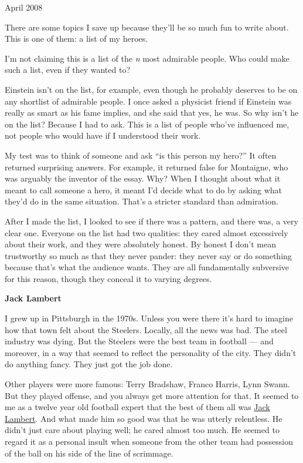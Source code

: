 April 2008

There are some topics I save up because they'll be so much fun to write
about. This is one of them: a list of my heroes.

I'm not claiming this is a list of the \emph{n} most admirable people.
Who could make such a list, even if they wanted to?

Einstein isn't on the list, for example, even though he probably
deserves to be on any shortlist of admirable people. I once asked a
physicist friend if Einstein was really as smart as his fame implies,
and she said that yes, he was. So why isn't he on the list? Because I
had to ask. This is a list of people who've influenced me, not people
who would have if I understood their work.

My test was to think of someone and ask ``is this person my hero?'' It
often returned surprising answers. For example, it returned false for
Montaigne, who was arguably the inventor of the essay. Why? When I
thought about what it meant to call someone a hero, it meant I'd decide
what to do by asking what they'd do in the same situation. That's a
stricter standard than admiration.

After I made the list, I looked to see if there was a pattern, and there
was, a very clear one. Everyone on the list had two qualities: they
cared almost excessively about their work, and they were absolutely
honest. By honest I don't mean trustworthy so much as that they never
pander: they never say or do something because that's what the audience
wants. They are all fundamentally subversive for this reason, though
they conceal it to varying degrees.

\textbf{Jack Lambert}

I grew up in Pittsburgh in the 1970s. Unless you were there it's hard to
imagine how that town felt about the Steelers. Locally, all the news was
bad. The steel industry was dying. But the Steelers were the best team
in football --- and moreover, in a way that seemed to reflect the
personality of the city. They didn't do anything fancy. They just got
the job done.

Other players were more famous: Terry Bradshaw, Franco Harris, Lynn
Swann. But they played offense, and you always get more attention for
that. It seemed to me as a twelve year old football expert that the best
of them all was
\href{http://en.wikipedia.org/wiki/Jack_Lambert_(American_football_player)}{Jack
Lambert}. And what made him so good was that he was utterly relentless.
He didn't just care about playing well; he cared almost too much. He
seemed to regard it as a personal insult when someone from the other
team had possession of the ball on his side of the line of scrimmage.

